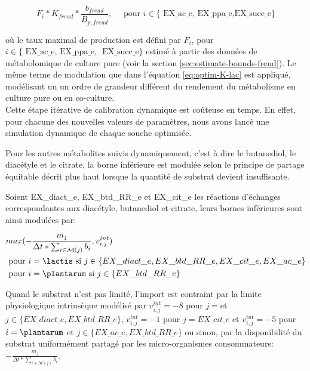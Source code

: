 \[F_{i}*K_{freud}* \frac{b_{freud}}{B_{p,freud}}, \quad \text{ pour } i \in \{\text{ EX\_ac\_e, EX\_ppa\_e,EX\_succ\_e} \}\]

où le taux maximal de production est défini par $F_{i}$, pour $i \in \{\text{ EX\_ac\_e,  EX\_ppa\_e,} $
$\text{ EX\_succ\_e} \}$ estimé à partir des données de métabolomique de culture pure (voir la section \ref{sec:estimate-bounds-freud}). Le même terme de modulation que dans l'équation \ref{eq:optim-K-lac} est appliqué, modélisant un un ordre de grandeur différent du rendement du métabolisme en culture pure ou en co-culture.\\

Cette étape itérative de calibration dynamique est coûteuse en temps. En effet, pour chacune des nouvelles valeurs de paramètres, nous avons lancé une simulation dynamique de chaque souche optimisée. 

Pour les autres métabolites suivis dynamiquement, c'est à dire le butanediol, le diacétyle et le citrate, la borne inférieure est modulée selon le principe de partage équitable décrit plus haut lorsque la quantité de substrat devient insuffisante.

Soient EX\_diact\_e, EX\_btd\_RR\_e et EX\_cit\_e les réactions d'échanges correspondantes aux diacétyle, butanediol et citrate, leurs bornes inférieures sont ainsi modulées par:

\begin{align*}
&max(-\frac{m_{j}}{\Delta t*\sum_{i \in \mathcal{M}(j)} b_i},v^{int}_{i,j})\\
&\text{ pour }i=\text{\lactis si } j \in \{EX\_diact\_e,EX\_btd\_RR\_e,EX\_cit\_e,EX\_ac\_e\}\\
&\text{ pour }i=\text{\plantarum si } j \in \{EX\_btd\_RR\_e\}
\end{align*}

Quand le substrat n'est pas limité, l'import est contraint par la limite physiologique intrinsèque modélisé par $v^{int}_{i,j} = -8$ pour $j=$\lactis et $j \in \{EX\_diact\_e,EX\_btd\_RR\_e\}$,
$v^{int}_{i,j} = -1$ pour $j=EX\_cit\_e$ et $v^{int}_{i,j} = -5$ pour $i=\plantarum$ et $j \in \{EX\_ac\_e,EX\_btd\_RR\_e\}$ ou sinon, par la disponibilité du substrat uniformément partagé par les micro-organismes consommateurs: $-\frac{m_{j}}{\Delta t*\sum_{i \in \mathcal{M}(j)} b_i}$.\\


